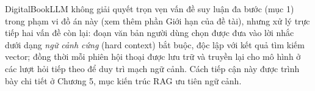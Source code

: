 DigitalBookLLM không giải quyết trọn vẹn vấn đề suy luận đa bước (mục 1) trong phạm vi đồ án này (xem thêm phần Giới hạn của đề tài), nhưng xử lý trực tiếp hai vấn đề còn lại: đoạn văn bản người dùng chọn được đưa vào lời nhắc dưới dạng \textit{ngữ cảnh cứng} (hard context) bắt buộc, độc lập với kết quả tìm kiếm vector; đồng thời mỗi phiên hội thoại được lưu trữ và truyền lại cho mô hình ở các lượt hỏi tiếp theo để duy trì mạch ngữ cảnh. Cách tiếp cận này được trình bày chi tiết ở Chương 5, mục kiến trúc RAG ưu tiên ngữ cảnh.